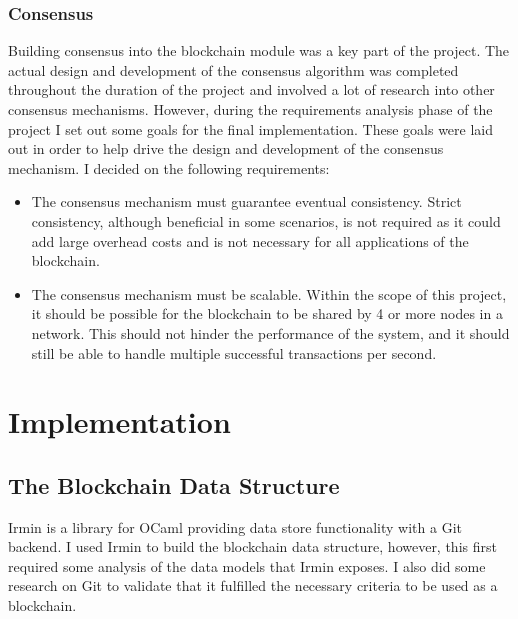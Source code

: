 \documentclass[12pt,a4paper,twoside,openright]{report}
\begin{document}
	\subsection{Consensus}
	Building consensus into the blockchain module was a key part of the project. 
	The actual design and development of the consensus algorithm was completed throughout the duration of the project and involved a lot of research into other consensus mechanisms.
	However, during the requirements analysis phase of the project I set out some goals for the final implementation.
	These goals were laid out in order to help drive the design and development of the consensus mechanism. 
	I decided on the following requirements:
	\begin{itemize}
		\item The consensus mechanism must guarantee eventual consistency. Strict consistency, although beneficial in some scenarios, is not required as it could add large overhead costs and is not necessary for all applications of the blockchain.
		\item The consensus mechanism must be scalable. Within the scope of this project, it should be possible for the blockchain to be shared by 4 or more nodes in a network. This should not hinder the performance of the system, and it should still be able to handle multiple successful transactions per second.
	\end{itemize}

	\chapter{Implementation} \label{Implementation}
	\section{The Blockchain Data Structure}
	Irmin is a library for OCaml providing data store functionality with a Git backend. 
	I used Irmin to build the blockchain data structure, however, this first required some analysis of the data models that Irmin exposes.
	I also did some research on Git to validate that it fulfilled the necessary criteria to be used as a blockchain.
\end{document}
